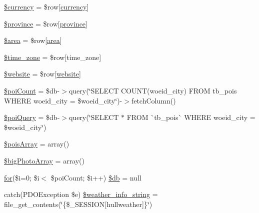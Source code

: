 \begin{DoxyCompactItemize}
\item 
\mbox{\hyperlink{hull_2index_8php_a37d22fd3b896e9d5488f3479a4d8f451}{\$currency}} = \$row\mbox{[}\textquotesingle{}\mbox{\hyperlink{index_8php_abd84e0698c321abdbf211d5b8425d0b5}{currency}}\textquotesingle{}\mbox{]}
\item 
\mbox{\hyperlink{hull_2index_8php_a0bdd006d1becad76055fe31c887fdfaf}{\$province}} = \$row\mbox{[}\textquotesingle{}\mbox{\hyperlink{index_8php_a38d70414c65575df5643ad4296c9db2e}{province}}\textquotesingle{}\mbox{]}
\item 
\mbox{\hyperlink{hull_2index_8php_a460a08379d150f8c151a07ad9a3251cd}{\$area}} = \$row\mbox{[}\textquotesingle{}\mbox{\hyperlink{index_8php_a5198216176428aa2303311f956213f33}{area}}\textquotesingle{}\mbox{]}
\item 
\mbox{\hyperlink{hull_2index_8php_adce4610b55a895abff73b5ed259c4bd3}{\$time\+\_\+zone}} = \$row\mbox{[}\textquotesingle{}time\+\_\+zone\textquotesingle{}\mbox{]}
\item 
\mbox{\hyperlink{hull_2index_8php_a2887d41d3bb2498db735eeb87efa2d73}{\$website}} = \$row\mbox{[}\textquotesingle{}\mbox{\hyperlink{index_8php_a8c56014cff17c1ced653aa98455da680}{website}}\textquotesingle{}\mbox{]}
\item 
\mbox{\hyperlink{hull_2index_8php_a8fb5f82500861c51c8fcfd700321e59e}{\$poi\+Count}} = \$db-\/$>$query(\char`\"{}S\+E\+L\+E\+CT C\+O\+U\+NT(woeid\+\_\+city) F\+R\+OM tb\+\_\+pois W\+H\+E\+RE woeid\+\_\+city = \$woeid\+\_\+city\char`\"{})-\/$>$fetch\+Column()
\item 
\mbox{\hyperlink{hull_2index_8php_a735d09bd88bab2d39b5d123b6a1ac7e9}{\$poi\+Query}} = \$db-\/$>$query(\char`\"{}S\+E\+L\+E\+CT $\ast$ F\+R\+OM \`{}tb\+\_\+pois\`{} W\+H\+E\+RE woeid\+\_\+city = \$woeid\+\_\+city\char`\"{})
\item 
\mbox{\hyperlink{hull_2index_8php_aba22eb823924400ba310cca9821c67b3}{\$pois\+Array}} = array()
\item 
\mbox{\hyperlink{hull_2index_8php_aab544b20d0152a1bf9eeb8db3e9f0577}{\$big\+Photo\+Array}} = array()
\item 
\mbox{\hyperlink{index_8php_aa11bce3c9d33806cade344b0536e0508}{for}}(\$i=0; \$i$<$ \$poi\+Count; \$i++) \mbox{\hyperlink{hull_2index_8php_ae26e87d17180fc87313d19b439092f0f}{\$db}} = null
\item 
catch(P\+D\+O\+Exception \$e) \mbox{\hyperlink{hull_2index_8php_aa85edc6c515eee98e2848667893e007d}{\$weather\+\_\+info\+\_\+string}} = file\+\_\+get\+\_\+contents(\char`\"{}\{\$\+\_\+\+S\+E\+S\+S\+I\+ON\mbox{[}\textquotesingle{}hullweather\textquotesingle{}\mbox{]}\}\char`\"{})

\end{DoxyCompactItemize}
